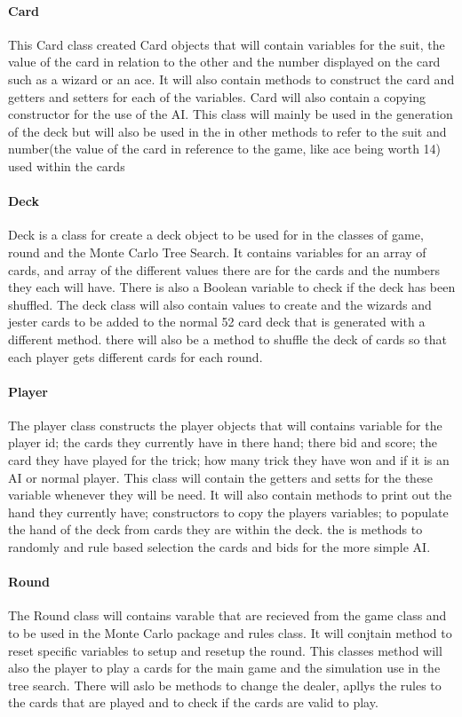 \paragraph{Card}
This Card class created Card objects that will contain variables for the suit, the value of the card in relation to the other and the number displayed on the card such as a wizard or an ace. It will also contain methods to construct the card and getters and setters for each of the variables. Card will also contain a copying constructor for the use of the AI. This class will mainly be used in the generation of the deck but will also be used in the in other methods to refer to the suit and number(the value of the card in reference to the game, like ace being worth 14) used within the cards
\paragraph{Deck}
Deck is a class for create a deck object to be used for in the classes of game, round and the Monte Carlo Tree Search. It contains variables for an array of cards, and array of the different values there are for the cards and the numbers they each will have. There is also a Boolean variable to check if the deck has been shuffled. The deck class will also contain values to create and the wizards and jester cards to be added to the normal 52 card deck that is generated with a different method. there will also be a method to shuffle the deck of cards so that each player gets different cards for each round.
\paragraph{Player} 
The player class constructs the player objects that will contains variable for the player id; the cards they currently have in there hand; there bid and score; the card they have played for the trick; how many trick they have won and if it is an AI or normal player. This class will contain the getters and setts for the these variable whenever they will be need. It will also contain methods to print out the hand they currently have; constructors to copy the players variables; to populate the hand of the deck from cards they are within the deck. the is methods to randomly and rule based selection the cards and bids for the more simple AI.
\paragraph{Round}
The Round class will contains varable that are recieved from the game class and to be used in the Monte Carlo package and rules class. It will conjtain method to reset specific variables to setup and resetup the round.  This classes method will also the player to play a cards for the main game and the simulation use in the tree search. There will aslo be methods to change the dealer, apllys the rules to the cards that are played and to check if the cards are valid to play.
